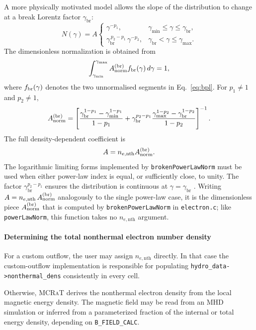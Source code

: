 \documentclass[12pt,a4paper]{article}
\newcommand{\gmin}{\gamma_{\min}}
\newcommand{\gmax}{\gamma_{\max}}
\newcommand{\gbr}{\gamma_{\mathrm{br}}}
\newcommand{\nenth}{n_{e,\mathrm{nth}}}
\newcommand{\code}[1]{\texttt{#1}}
\newcommand{\raikou}{\textsc{Raikou}}
\newcommand{\mcrat}{\textsc{MCRaT}}
\begin{document}
A more physically motivated model allows the slope of the distribution to
change at a break Lorentz factor $\gbr$:
\begin{equation}
	N(\gamma) = A \begin{cases}
		\gamma^{-p_1}, & \gmin \le \gamma \le \gbr, \\[4pt]
		\gbr^{\,p_2 - p_1}\,\gamma^{-p_2}, & \gbr < \gamma \le \gmax.
	\end{cases}
	\label{eq:bpl}
\end{equation}
The dimensionless normalization is obtained from
\begin{equation}
	\int_{\gmin}^{\gmax}
	A_{\rm norm}^{(\mathrm{br})}f_{\rm br}(\gamma)\,d\gamma
	=
	1,
\end{equation}
where $f_{\rm br}(\gamma)$ denotes the two unnormalised segments in
Eq.~\eqref{eq:bpl}. For $p_1\ne1$ and $p_2\ne1$,
\begin{equation}
	A_{\rm norm}^{(\mathrm{br})}
	=
	\left[
	\frac{
		\gbr^{1-p_1}-\gmin^{1-p_1}
	}{
		1-p_1
	}
	+
	\gbr^{p_2-p_1}
	\frac{
		\gmax^{1-p_2}-\gbr^{1-p_2}
	}{
		1-p_2
	}
	\right]^{-1}.
	\label{eq:bpl_norm}
\end{equation}
The full density-dependent coefficient is
\begin{equation}
	A
	=
	\nenth A_{\rm norm}^{(\mathrm{br})}.
\end{equation}
The logarithmic limiting forms implemented by
\code{brokenPowerLawNorm} must be used when either power-law index is
equal, or sufficiently close, to unity.
The factor $\gbr^{p_2-p_1}$ ensures the distribution is continuous at
$\gamma = \gbr$ \citep[\raikou{} Eqs.~A4--A5]{kawashima2023}. Writing $A = \nenth\,A_{\rm norm}^{\rm (br)}$ analogously to the single
power-law case, it is the dimensionless piece $A_{\rm norm}^{\rm (br)}$
that is computed by \code{brokenPowerLawNorm} in \code{electron.c};
like \code{powerLawNorm}, this function takes no $\nenth$ argument.

\paragraph{Determining the total nonthermal electron number density}
\label{sec:nth_dens}

For a custom outflow, the user may assign
$n_{e,\mathrm{nth}}$ directly. In that case the custom-outflow
implementation is responsible for populating
\code{hydro\_data->nonthermal\_dens} consistently in every cell.

Otherwise, \mcrat{} derives the nonthermal electron density from the local
magnetic energy density. The magnetic field may be read from an MHD
simulation or inferred from a parameterized fraction of the internal or
total energy density, depending on \code{B\_FIELD\_CALC}.
\end{document}
